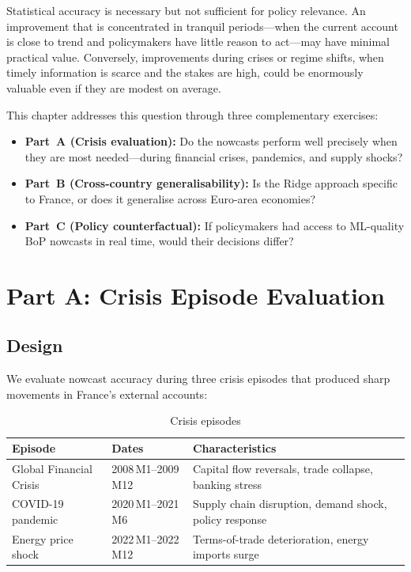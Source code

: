 Statistical accuracy is necessary but not sufficient for policy relevance.  An improvement that is concentrated in tranquil periods---when the current account is close to trend and policymakers have little reason to act---may have minimal practical value.  Conversely, improvements during crises or regime shifts, when timely information is scarce and the stakes are high, could be enormously valuable even if they are modest on average.

This chapter addresses this question through three complementary exercises:
\begin{itemize}
  \item \textbf{Part~A (Crisis evaluation):} Do the nowcasts perform well precisely when they are most needed---during financial crises, pandemics, and supply shocks?
  \item \textbf{Part~B (Cross-country generalisability):} Is the Ridge approach specific to France, or does it generalise across Euro-area economies?
  \item \textbf{Part~C (Policy counterfactual):} If policymakers had access to ML-quality BoP nowcasts in real time, would their decisions differ?
\end{itemize}


\section{Part A: Crisis Episode Evaluation}
\label{sec:ch3_crisis}

\subsection{Design}

We evaluate nowcast accuracy during three crisis episodes that produced sharp movements in France's external accounts:

\begin{table}[htbp]
\centering
\caption{Crisis episodes}
\label{tab:ch3_episodes}
\begin{tabular}{@{} l l p{7cm} @{}}
\toprule
{Episode} & {Dates} & {Characteristics} \\
\midrule
Global Financial Crisis & 2008\,M1--2009\,M12 & Capital flow reversals, trade collapse, banking stress \\
COVID-19 pandemic & 2020\,M1--2021\,M6 & Supply chain disruption, demand shock, policy response \\
Energy price shock & 2022\,M1--2022\,M12 & Terms-of-trade deterioration, energy imports surge \\
\bottomrule
\end{tabular}
\end{table}

